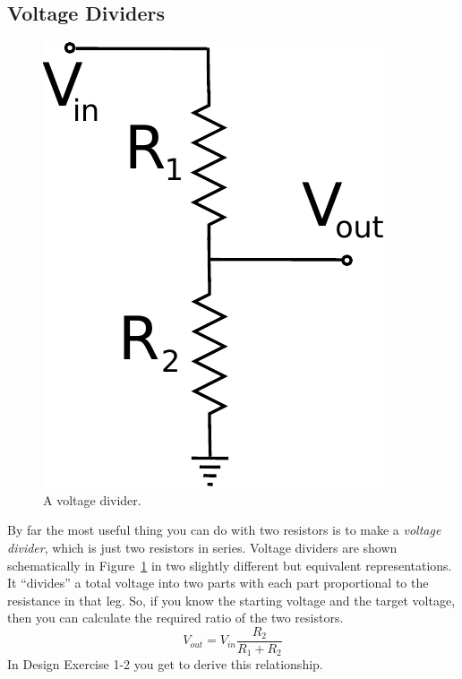 \documentclass{article}
\begin{document}
\subsection{Voltage Dividers}
\begin{figure}
\centering
\includegraphics[height=0.2\textheight]{pics/unloaded_voltage_divider.pdf}
\caption{A voltage divider.}
\label{fig:unloaded_voltage_divider}
\end{figure}
By far the most useful thing you can do with two resistors is to make a \emph{voltage divider}, which is just two resistors in series. Voltage dividers are shown schematically in Figure~\ref{fig:unloaded_voltage_divider} in two slightly different but equivalent representations. It ``divides'' a total voltage into two parts with each part proportional to the resistance in that leg. So, if you know the starting voltage and the target voltage, then you can calculate the required ratio of the two resistors.
\begin{equation}
V_{out} = V_{in} \frac{R_2}{R_1 + R_2}
\end{equation}
In Design Exercise 1-2 you get to derive this relationship.
\end{document}
